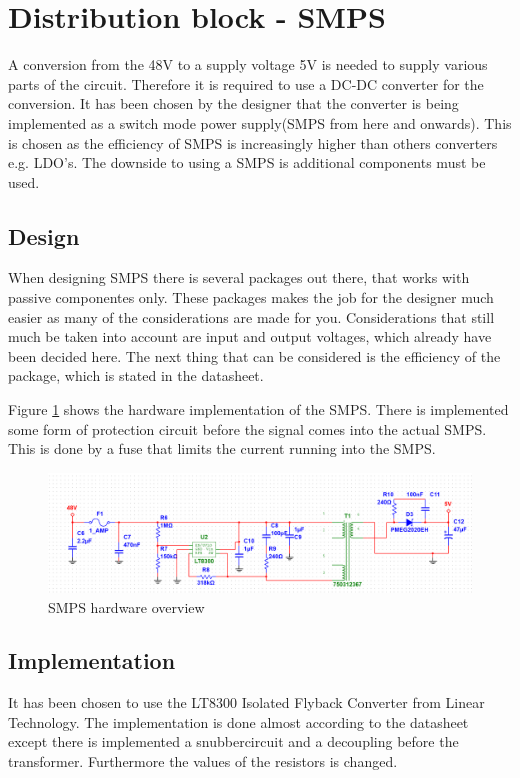 \section{Distribution block - SMPS}
A conversion from the 48V to a supply voltage 5V is needed to supply various parts of the circuit. Therefore it is required to use a DC-DC converter for the conversion. It has been chosen by the designer that the converter is being implemented as a switch mode power supply(SMPS from here and onwards). This is chosen as the efficiency of SMPS is increasingly higher than others converters e.g. LDO's. The downside to using a SMPS is additional components must be used.  

\subsection{Design}

When designing SMPS there is several packages out there, that works with passive componentes only. These packages makes the job for the designer much easier as many of the considerations are made for you. Considerations that still much be taken into account are input and output voltages, which already have been decided here. The next thing that can be considered is the efficiency of the package, which is stated in the datasheet.

Figure \ref{fig:SMPS_control} shows the hardware implementation of the SMPS. There is implemented some form of protection circuit before the signal comes into the actual SMPS. This is done by a fuse that limits the current running into the SMPS. 

\begin{figure}[H]
	\centering
	\includegraphics[width=0.7\linewidth]{Hardware/Pictures/SMPS_hw}
	\caption{SMPS hardware overview}
	\label{fig:SMPS_control}
\end{figure}

\subsection{Implementation}
It has been chosen to use the LT8300 Isolated Flyback Converter from Linear Technology. The implementation is done almost according to the datasheet  except there is implemented a snubbercircuit and a decoupling before the transformer. Furthermore the values of the resistors is changed.  \\

